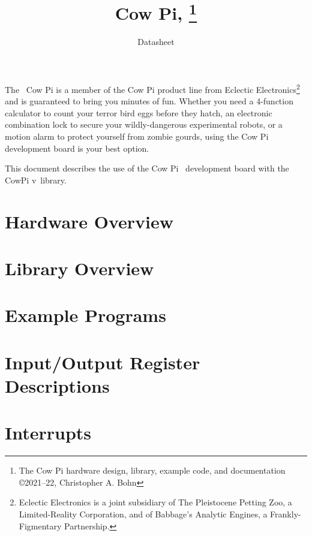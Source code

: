 \documentclass[12pt]{article}
\begin{document}
    \pagestyle{fancy}
    \fancyhf{}
    \cfoot{\thepage}
    \title{Cow Pi, \hardwareversion\footnote{The Cow Pi hardware design, library, example code, and documentation \copyright 2021--22, Christopher A. Bohn}}
    \author{Datasheet}
    \date{}
    \maketitle

    The \hardwareversion\ Cow Pi is a member of the Cow Pi product line from Eclectic Electronics\footnote{
        Eclectic Electronics is a joint subsidiary of The Pleistocene Petting Zoo, a Limited-Reality Corporation, and of Babbage's Analytic Engines, a Frankly-Figmentary Partnership.}
    and is guaranteed to bring you minutes of fun.
    Whether you need a 4-function calculator to count your terror bird eggs before they hatch, an electronic combination lock to secure your wildly-dangerous experimental robots, or a motion alarm to protect yourself from zombie gourds, using the Cow Pi development board is your best option.

    This document describes the use of the Cow Pi \cowpiversion\ development board with the CowPi v\softwareversion\ library.

    \tableofcontents


    \section{Hardware Overview} 

    \section{Library Overview} 

    \section{Example Programs} 

    \section{Input/Output Register Descriptions} \label{sec:IOregisterDescriptions} 

    \section{Interrupts} \label{sec:Interrupts}
\end{document}
